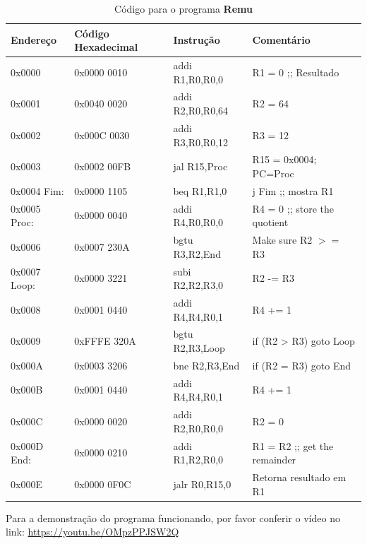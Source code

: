 \documentclass[12pt]{article}
\begin{document}
\begin{table}[H]
    \centering
    \caption{Código para o programa \textbf{Remu}}
    \begin{tabular}{|l|l|l|l|}\hline
        \textbf{Endereço} & \textbf{Código Hexadecimal} & \textbf{Instrução} & \textbf{Comentário} \\\hline
        0x0000       & 0x0000 0010 & addi R1,R0,R0,0  & R1 = 0 ;; Resultado           \\\hline
        0x0001       & 0x0040 0020 & addi R2,R0,R0,64 & R2 = 64                       \\\hline
        0x0002       & 0x000C 0030 & addi R3,R0,R0,12 & R3 = 12                       \\\hline
        0x0003       & 0x0002 00FB & jal R15,Proc     & R15 = 0x0004; PC=Proc         \\\hline
        0x0004 Fim:  & 0x0000 1105 & beq R1,R1,0      & j Fim ;; mostra R1            \\\hline
        0x0005 Proc: & 0x0000 0040 & addi R4,R0,R0,0  & R4 = 0 ;; store the quotient  \\\hline
        0x0006       & 0x0007 230A & bgtu R3,R2,End   & Make sure R2 $>=$ R3          \\\hline
        0x0007 Loop: & 0x0000 3221 & subi R2,R2,R3,0  & R2 -= R3                      \\\hline
        0x0008       & 0x0001 0440 & addi R4,R4,R0,1  & R4 += 1                       \\\hline
        0x0009       & 0xFFFE 320A & bgtu R2,R3,Loop  & if (R2 > R3) goto Loop        \\\hline
        0x000A       & 0x0003 3206 & bne  R2,R3,End   & if (R2 \!= R3) goto End       \\\hline
        0x000B       & 0x0001 0440 & addi R4,R4,R0,1  & R4 += 1                       \\\hline
        0x000C       & 0x0000 0020 & addi R2,R0,R0,0  & R2 = 0                        \\\hline
        0x000D End:  & 0x0000 0210 & addi R1,R2,R0,0  & R1 = R2 ;; get the remainder  \\\hline
        0x000E       & 0x0000 0F0C & jalr R0,R15,0    & Retorna resultado em R1       \\\hline
    \end{tabular}\label{tab:programs:remu}
\end{table}

Para a demonstração do programa funcionando, por favor conferir o vídeo no link:
\href{https://youtu.be/OMpzPPJSW2Q}{https://youtu.be/OMpzPPJSW2Q}
\end{document}
